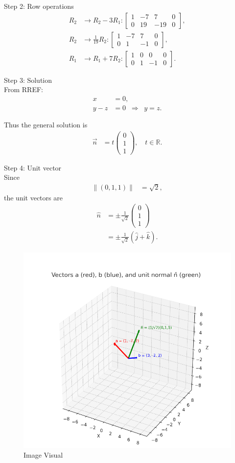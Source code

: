 \documentclass[journal]{IEEEtran}
\begin{document}
Step 2: Row operations\\
\begin{align}
R_2 &\to R_2 - 3R_1: 
\left[\begin{array}{ccc|c}
1 & -7 & 7 & 0\\
0 & 19 & -19 & 0
\end{array}\right], \label{eq:row1}\\[6pt]
R_2 &\to \tfrac{1}{19}R_2: 
\left[\begin{array}{ccc|c}
1 & -7 & 7 & 0\\
0 & 1 & -1 & 0
\end{array}\right], \label{eq:row2}\\[6pt]
R_1 &\to R_1 + 7R_2: 
\left[\begin{array}{ccc|c}
1 & 0 & 0 & 0\\
0 & 1 & -1 & 0
\end{array}\right]. \label{eq:row3}
\end{align}

Step 3: Solution\\
From RREF:
\begin{align}
x &= 0, \label{eq:x0}\\
y - z &= 0 \;\;\Rightarrow\;\; y=z. \label{eq:yz}
\end{align}

Thus the general solution is
\begin{align}
\vec{n} &= t\begin{pmatrix}0\\1\\1\end{pmatrix}, \quad t\in\mathbb{R}. \label{eq:gensol}
\end{align}

Step 4: Unit vector\\
Since 
\begin{align}
\|(0,1,1)\| &= \sqrt{2}, \label{eq:norm}
\end{align}
the unit vectors are
\begin{align}
\hat{n} &= \pm \frac{1}{\sqrt{2}}\begin{pmatrix}0\\1\\1\end{pmatrix} \label{eq:unit1}\\
&= \pm \frac{1}{\sqrt{2}}(\hat{j}+\hat{k}). \label{eq:unit2}
\end{align}


\begin{figure}[H]
    \centering
    \includegraphics[width=0.75\columnwidth]{figs/image.png}
    \caption{Image Visual}
    \label{fig:figs/image.png}
\end{figure}
  
\end{document}
